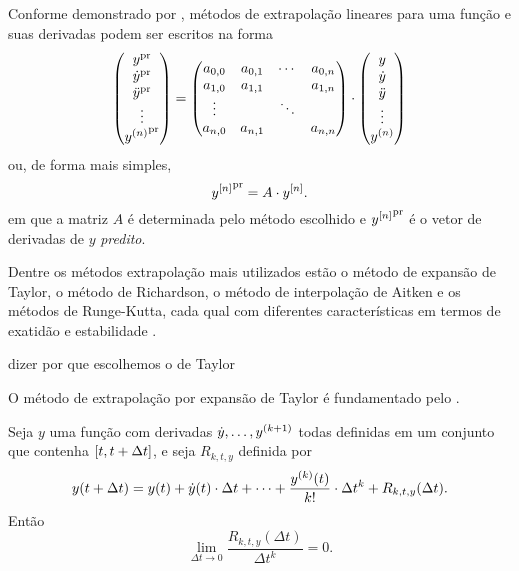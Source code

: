 Conforme demonstrado por , métodos de extrapolação lineares para uma função e suas derivadas podem ser escritos na forma
\[
\begin{pmatrix}
	\predicted{y} \\
	\predicted{\deriv{1}{y}} \\
	\predicted{\deriv{2}{y}} \\
	\vdots \\
	\predicted{\deriv{n}{y}}
\end{pmatrix}
=
\begin{pmatrix}
	a_{0,0} & a_{0,1} & \cdots & a_{0,n} \\
	a_{1,0} & a_{1,1} &  & a_{1,n} \\
    \vdots & & \ddots & \\
    a_{n,0} & a_{n,1} & & a_{n,n}
\end{pmatrix}
\cdot
\begin{pmatrix}
	y \\
	\deriv{1}{y} \\
	\deriv{2}{y} \\
	\vdots \\
	\deriv{n}{y}
\end{pmatrix}
\]
ou, de forma mais simples,
\begin{equation}
	\predicted{\drvec{n}{y}} = A \cdot \drvec{n}{y}.
\end{equation}
em que a matriz \(A\) é determinada pelo método escolhido e \(\predicted{\drvec{n}{y}}\) é o vetor de derivadas de \(y\) \textit{predito}.

Dentre os métodos extrapolação mais utilizados estão o método de expansão de Taylor, o método de Richardson, o método de interpolação de Aitken e os métodos de Runge-Kutta, cada qual com diferentes características em termos de exatidão e estabilidade .

\alert{dizer por que escolhemos o de Taylor}

O método de extrapolação por expansão de Taylor é fundamentado pelo .

\begin{theorem} \label{theo:taylor}
	Seja \(y\) uma função com derivadas \(\deriv{1}{y},\dots,y^{\pqty{k+1}}\) todas definidas em um conjunto que contenha \(\bqty{t, t+\Delta t}\), e seja \(R_{k, t, y}\) definida por
    \begin{equation*}
    	y(t + \Delta t) = y(t) + \deriv{1}{y}(t)\cdot\Delta t + \dots + \dfrac{\deriv{k}{y}(t)}{k!}\cdot\Delta t^k + R_{k, t, y}(\Delta t).
    \end{equation*}
    Então
    \begin{equation} \label{eq:remainder_limit}
    	\lim_{\Delta t \rightarrow 0} \dfrac{R_{k, t, y}(\Delta t)}{\Delta t^k} = 0.
    \end{equation}
\end{theorem}

